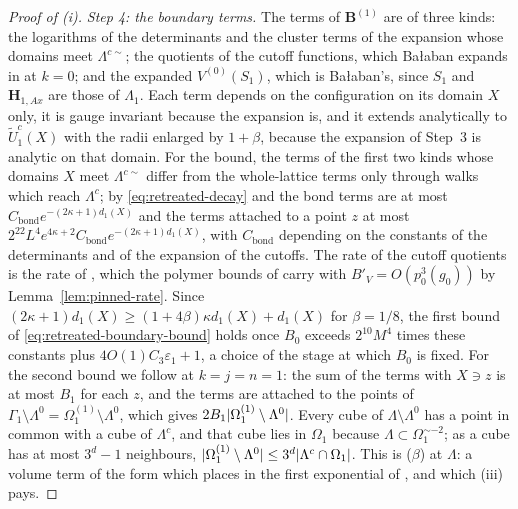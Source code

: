 \documentclass[11pt]{preprint}
\DeclarePairedDelimiter{\abs}{\lvert}{\rvert}
\numberwithin{equation}{section}
\theoremstyle{definition}
\theoremstyle{remark}
\theoremstyle{plain}
\begin{document}
\begin{proof}[Proof of (i)]
\emph{Step 4: the boundary terms.} The terms of $\mathbf B^{(1)}$ are of three kinds: the logarithms of the determinants and the cluster terms of the expansion whose domains meet $\Lambda^{c\sim}$; the quotients of the cutoff functions, which Ba{\l}aban expands in \cite[(3.32), p.~272]{BalabanCRE} at $k = 0$; and the expanded $V^{(0)}(S_1)$, which is Ba{\l}aban's, since $S_1$ and $\mathbf H_{1,Ax}$ are those of $\Lambda_1$. Each term depends on the configuration on its domain $X$ only, it is gauge invariant because the expansion is, and it extends analytically to $\tilde U^c_1(X)$ with the radii enlarged by $1 + \beta$, because the expansion of Step~3 is analytic on that domain. For the bound, the terms of the first two kinds whose domains $X$ meet $\Lambda^{c\sim}$ differ from the whole-lattice terms only through walks which reach $\Lambda^c$; by \eqref{eq:retreated-decay} and \cite[(3.108), p.~416]{BalabanPBG} the bond terms are at most $C_{\mathrm{bond}}e^{-(2\kappa + 1)d_1(X)}$ and the terms attached to a point $z$ at most $2^{22}L^4e^{4\kappa + 2}C_{\mathrm{bond}}e^{-(2\kappa + 1)d_1(X)}$, with $C_{\mathrm{bond}}$ depending on the constants of the determinants and of the expansion of the cutoffs. The rate of the cutoff quotients is the rate of \cite[(3.32)]{BalabanCRE}, which the polymer bounds of \cite[(2.38)]{BalabanRG2} carry with $B'_V = O(p_0^3(g_0))$ by Lemma~\ref{lem:pinned-rate}. Since $(2\kappa + 1)d_1(X) \geq (1 + 4\beta)\kappa d_1(X) + d_1(X)$ for $\beta = 1/8$, the first bound of \eqref{eq:retreated-boundary-bound} holds once $B_0$ exceeds $2^{10}M^4$ times these constants plus $4O(1)C_3\varepsilon_1 + 1$, a choice of the stage at which $B_0$ is fixed. For the second bound we follow \cite[(2.47)--(2.48), p.~264]{BalabanCRE} at $k = j = n = 1$: the sum of the terms with $X \ni z$ is at most $B_1$ for each $z$, and the terms are attached to the points of $\Gamma_1 \setminus \Lambda^0 = \Omega_1^{(1)} \setminus \Lambda^0$, which gives $2B_1\abs{\Omega_1^{(1)} \setminus \Lambda^0}$. Every cube of $\Lambda \setminus \Lambda^0$ has a point in common with a cube of $\Lambda^c$, and that cube lies in $\Omega_1$ because $\Lambda \subset \Omega_1^{\sim-2}$; as a cube has at most $3^d - 1$ neighbours, $\abs{\Omega_1^{(1)} \setminus \Lambda^0} \leq 3^d\abs{\Lambda^c \cap \Omega_1}$. This is ($\beta$) at $\Lambda$: a volume term of the form which \cite[p.~380, l.~27--29]{BalabanLFR2} places in the first exponential of \cite[(1.79)]{BalabanLFR2}, and which (iii) pays.


\end{proof}
\end{document}
